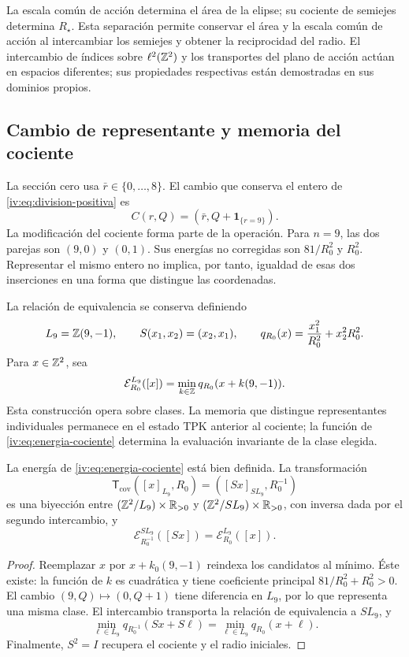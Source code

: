 La escala común de acción determina el área de la elipse; su cociente
de semiejes determina \(R_\star\). Esta separación permite conservar
el área y la escala común de acción al intercambiar los semiejes y obtener la reciprocidad
del radio. El intercambio de índices sobre \(\ell^2(\mathbb Z^2)\)
y los transportes del plano de acción actúan en espacios diferentes;
sus propiedades respectivas están demostradas en sus dominios propios.

\subsection{Cambio de representante y memoria del cociente}

La sección cero usa \(\bar r\in\{0,\ldots,8\}\). El cambio
que conserva el entero de \eqref{iv:eq:division-positiva} es
\begin{equation}
 C(r,Q)=(\bar r,Q+\mathbf1_{\{r=9\}}).
 \label{iv:eq:cambio-seccion}
\end{equation}
La modificación del cociente forma parte de la operación.
Para \(n=9\), las dos parejas son \((9,0)\) y \((0,1)\).
Sus energías no corregidas son \(81/R_0^2\) y \(R_0^2\).
Representar el mismo entero no implica, por tanto, igualdad de
esas dos inserciones en una forma que distingue las coordenadas.

La relación de equivalencia se conserva definiendo
\[
 L_9=\mathbb Z(9,-1),\qquad S(x_1,x_2)=(x_2,x_1),
 \qquad q_{R_0}(x)=\frac{x_1^2}{R_0^2}+x_2^2R_0^2.
\]
Para \(x\in\mathbb Z^2\), sea
\begin{equation}
 \mathcal E_{R_0}^{L_9}([x])
 =\min_{k\in\mathbb Z}q_{R_0}(x+k(9,-1)).
 \label{iv:eq:energia-cociente}
\end{equation}
Esta construcción opera sobre clases. La memoria que distingue
representantes individuales permanece en el estado TPK anterior
al cociente; la función de \eqref{iv:eq:energia-cociente}
determina la evaluación invariante de la clase elegida.

\begin{theorem}
\label{iv:thm:dualidad-cociente}
La energía de \eqref{iv:eq:energia-cociente} está bien definida.
La transformación
\[
 \mathsf T_{\mathrm{cov}}([x]_{L_9},R_0)
 =([Sx]_{SL_9},R_0^{-1})
\]
es una biyección entre
\((\mathbb Z^2/L_9)\times\mathbb R_{>0}\) y
\((\mathbb Z^2/SL_9)\times\mathbb R_{>0}\), con inversa dada por el
segundo intercambio, y
\[
 \mathcal E_{R_0^{-1}}^{SL_9}([Sx])
 =\mathcal E_{R_0}^{L_9}([x]).
\]
\end{theorem}
\begin{proof}
Reemplazar \(x\) por \(x+k_0(9,-1)\) reindexa los candidatos
al mínimo. Éste existe: la función de \(k\) es cuadrática y
tiene coeficiente principal \(81/R_0^2+R_0^2>0\). El cambio
\((9,Q)\mapsto(0,Q+1)\) tiene diferencia en \(L_9\), por
lo que representa una misma clase. El intercambio transporta
la relación de equivalencia a \(SL_9\), y
\[
 \min_{\ell\in L_9}q_{R_0^{-1}}(Sx+S\ell)
 =\min_{\ell\in L_9}q_{R_0}(x+\ell).
\]
Finalmente, \(S^2=I\) recupera el cociente y el radio iniciales.
\end{proof}

